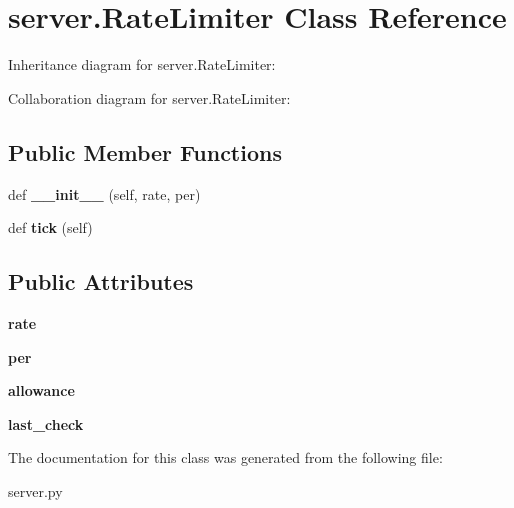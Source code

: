 \hypertarget{classserver_1_1RateLimiter}{}\section{server.\+Rate\+Limiter Class Reference}
\label{classserver_1_1RateLimiter}


Inheritance diagram for server.\+Rate\+Limiter\+:


Collaboration diagram for server.\+Rate\+Limiter\+:
\subsection*{Public Member Functions}
\begin{DoxyCompactItemize}
\item 
\mbox{\label{classserver_1_1RateLimiter_a79f09a0b070dcbb8776671778ca2bb5d}} 
def {\bfseries \+\_\+\+\_\+init\+\_\+\+\_\+} (self, rate, per)
\item 
\mbox{\label{classserver_1_1RateLimiter_ade1ad2750a0031068879aae684adb78c}} 
def {\bfseries tick} (self)
\end{DoxyCompactItemize}
\subsection*{Public Attributes}
\begin{DoxyCompactItemize}
\item 
\mbox{\label{classserver_1_1RateLimiter_aa1675e0ed19da619c2d1cc3db01190f8}} 
{\bfseries rate}
\item 
\mbox{\label{classserver_1_1RateLimiter_aba1799f8a14f8e5d9a1a404ac8935d1d}} 
{\bfseries per}
\item 
\mbox{\label{classserver_1_1RateLimiter_a38671d921e0ab4188215da3b931681c6}} 
{\bfseries allowance}
\item 
\mbox{\label{classserver_1_1RateLimiter_a940bc36975e7961d394c089beb7abeb1}} 
{\bfseries last\+\_\+check}
\end{DoxyCompactItemize}


The documentation for this class was generated from the following file\+:\begin{DoxyCompactItemize}
\item 
server.\+py\end{DoxyCompactItemize}
